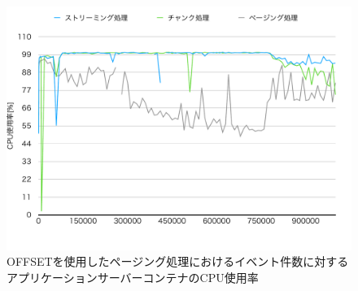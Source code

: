 \documentclass[../../../../../main]{subfiles}
\begin{document}
    \begin{figure}[H]
        \centering
        \includegraphics[width=12cm]{graph}
        \caption{OFFSETを使用したページング処理におけるイベント件数に対するアプリケーションサーバーコンテナのCPU使用率}
        \label{fig:each-way-app-cpu-app_1_1024-db_1_1024}
    \end{figure}
\end{document}
